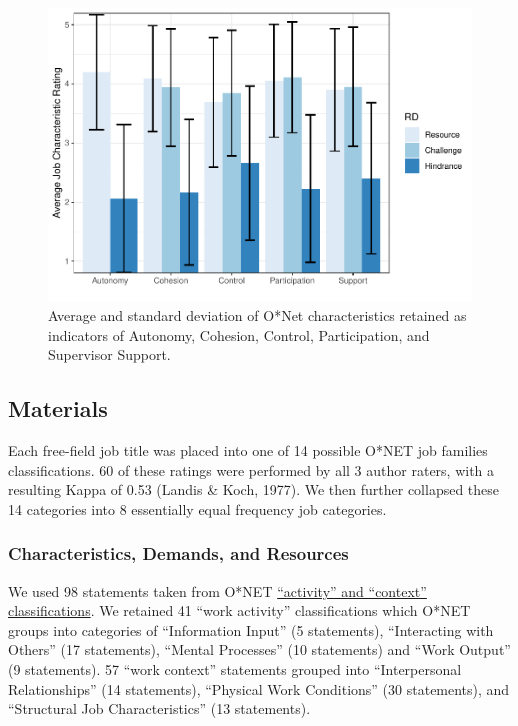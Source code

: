 \documentclass[
  english,
  man]{apa6}
\begin{document}
\begin{figure}
\centering
\includegraphics{Submission_files/figure-latex/litresources-1.pdf}
\caption{\label{fig:litresources}Average and standard deviation of O*Net characteristics retained as indicators of Autonomy, Cohesion, Control, Participation, and Supervisor Support.}
\end{figure}

\hypertarget{materials}{%
\subsection{Materials}\label{materials}}

Each free-field job title was placed into one of 14 possible O*NET job families classifications. 60 of these ratings were performed by all 3 author raters, with a resulting Kappa of 0.53 (Landis \& Koch, 1977). We then further collapsed these 14 categories into 8 essentially equal frequency job categories.

\hypertarget{characteristics-demands-and-resources}{%
\subsubsection{Characteristics, Demands, and Resources}\label{characteristics-demands-and-resources}}

We used 98 statements taken from O*NET \href{https://www.O*NETonline.org/find/descriptor/result/4.A.1.b.3}{``activity'' and ``context'' classifications}. We retained 41 ``work activity'' classifications which O*NET groups into categories of ``Information Input'' (5 statements), ``Interacting with Others'' (17 statements), ``Mental Processes'' (10 statements) and ``Work Output'' (9 statements). 57 ``work context'' statements grouped into ``Interpersonal Relationships'' (14 statements), ``Physical Work Conditions'' (30 statements), and ``Structural Job Characteristics'' (13 statements).
\end{document}
